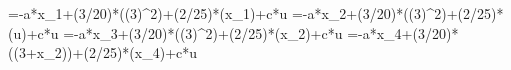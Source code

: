 =-a*x_1+(3/20)*\sin((3)^2)+(2/25)*\cos(x_1)+c*u
=-a*x_2+(3/20)*\sin((3)^2)+(2/25)*\cos(u)+c*u
=-a*x_3+(3/20)*\sin((3)^2)+(2/25)*\cos(x_2)+c*u
=-a*x_4+(3/20)*\sin((3+x_2))+(2/25)*\cos(x_4)+c*u

